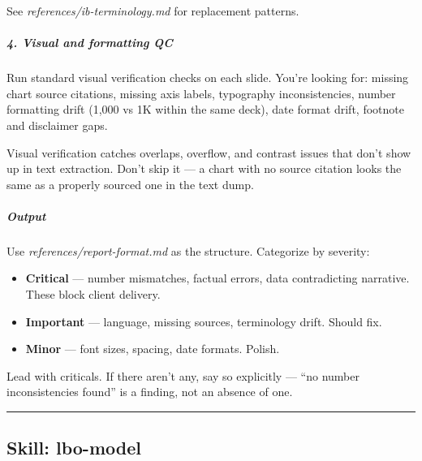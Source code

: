 \documentclass[11pt]{article}
\begin{document}
See \emph{references/ib-terminology.md} for replacement patterns.


\subparagraph{4. Visual and formatting QC}\mbox{}\par

Run standard visual verification checks on each slide. You're looking for: missing chart source citations, missing axis labels, typography inconsistencies, number formatting drift (1,000 vs 1K within the same deck), date format drift, footnote and disclaimer gaps.


Visual verification catches overlaps, overflow, and contrast issues that don't show up in text extraction. Don't skip it — a chart with no source citation looks the same as a properly sourced one in the text dump.


\subparagraph{Output}\mbox{}\par

Use \emph{references/report-format.md} as the structure. Categorize by severity:


\begin{itemize}[leftmargin=*,itemsep=2pt,topsep=2pt]
\item {} \textbf{Critical} — number mismatches, factual errors, data contradicting narrative. These block client delivery.
\item {} \textbf{Important} — language, missing sources, terminology drift. Should fix.
\item {} \textbf{Minor} — font sizes, spacing, date formats. Polish.
\end{itemize}

Lead with criticals. If there aren't any, say so explicitly — ``no number inconsistencies found'' is a finding, not an absence of one.


\vspace{0.8em}\hrule\vspace{0.8em}

\subsection{Skill: lbo-model}\label{file:skills-lbo-model-SKILL-md}
\end{document}
